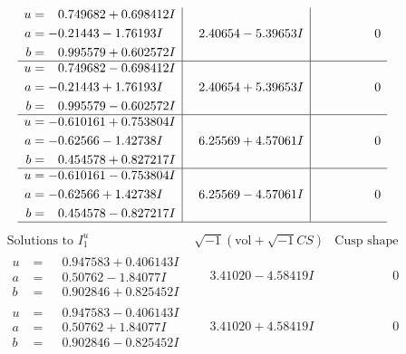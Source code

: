 \documentclass[1p]{elsarticle_modified}
\theoremstyle{definition}
\newcommand{\I}{\sqrt{-1}}
\begin{document}
$$\begin{array}{c|c|c}
\begin{aligned}
u &= \phantom{-}0.749682 + 0.698412 I \\
a &= -0.21443 - 1.76193 I \\
b &= \phantom{-}0.995579 + 0.602572 I\end{aligned}
 & \phantom{-}2.40654 - 5.39653 I & \phantom{-0.000000 } 0 \\ \hline\begin{aligned}
u &= \phantom{-}0.749682 - 0.698412 I \\
a &= -0.21443 + 1.76193 I \\
b &= \phantom{-}0.995579 - 0.602572 I\end{aligned}
 & \phantom{-}2.40654 + 5.39653 I & \phantom{-0.000000 } 0 \\ \hline\begin{aligned}
u &= -0.610161 + 0.753804 I \\
a &= -0.62566 - 1.42738 I \\
b &= \phantom{-}0.454578 + 0.827217 I\end{aligned}
 & \phantom{-}6.25569 + 4.57061 I & \phantom{-0.000000 } 0 \\ \hline\begin{aligned}
u &= -0.610161 - 0.753804 I \\
a &= -0.62566 + 1.42738 I \\
b &= \phantom{-}0.454578 - 0.827217 I\end{aligned}
 & \phantom{-}6.25569 - 4.57061 I & \phantom{-0.000000 } 0\\
 \hline 
 \end{array}$$\newpage$$\begin{array}{c|c|c}  
\text{Solutions to }I^u_{1}& \I (\text{vol} + \sqrt{-1}CS) & \text{Cusp shape}\\
 \hline 
\begin{aligned}
u &= \phantom{-}0.947583 + 0.406143 I \\
a &= \phantom{-}0.50762 - 1.84077 I \\
b &= \phantom{-}0.902846 + 0.825452 I\end{aligned}
 & \phantom{-}3.41020 - 4.58419 I & \phantom{-0.000000 } 0 \\ \hline\begin{aligned}
u &= \phantom{-}0.947583 - 0.406143 I \\
a &= \phantom{-}0.50762 + 1.84077 I \\
b &= \phantom{-}0.902846 - 0.825452 I\end{aligned}
 & \phantom{-}3.41020 + 4.58419 I & \phantom{-0.000000 } 0 \\ \hline\begin{aligned}

\end{aligned}
\end{array}$$
\end{document}

